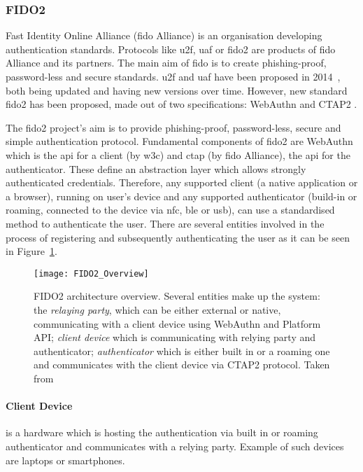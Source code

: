 \subsubsection{FIDO2}

Fast Identity Online Alliance (\acrshort{fido} Alliance) is an organisation developing authentication standards. Protocols like \acrfull{u2f}, \acrfull{uaf} or \acrshort{fido}2 are products of \acrshort{fido} Alliance and its partners.
The main aim of \acrshort{fido} is to create phishing-proof, password-less and secure standards. \acrshort{u2f} and \acrshort{uaf} have been proposed in 2014~\cite{Lindemann2014FIDOV1.0, Srinivas2014UniversalU2F}, both being updated and having new versions over time. However, new standard  \acrshort{fido}2 has been proposed, made out of two specifications: WebAuthn \cite{Balfanz2019Web1} and CTAP2 \cite{Brand2019ClientCTAP}.

The \acrshort{fido}2 project’s aim is to provide phishing-proof, password-less, secure and simple authentication protocol. Fundamental components of \acrshort{fido}2 are WebAuthn which is the \acrshort{api} for a client (by \acrshort{w3c}) and \acrshort{ctap} (by \acrshort{fido} Alliance), the \acrshort{api} for the authenticator. These define an abstraction layer which allows strongly authenticated credentials. Therefore, any supported client (a native application or a browser), running on user’s device and any supported authenticator (build-in or roaming, connected to the device via \acrshort{nfc}, \acrshort{ble} or \acrshort{usb}), can use a standardised method to authenticate the user. There are several entities involved in the process of registering and subsequently authenticating the user as it can be seen in Figure~\ref{fig:fido2_overview}.

\begin{figure}[ht]
    \centering
    \texttt{[image: FIDO2\_Overview]}
    \caption{FIDO2 architecture overview. Several entities make up the system: the \textit{relaying party}, which can be either external or native, communicating with a client device using WebAuthn and Platform API; \textit{client device} which is communicating with relying party and authenticator; \textit{authenticator} which is either built in or a roaming one and communicates with the client device via CTAP2 protocol. Taken from~\cite{Dingle2018All288910}}
    \label{fig:fido2_overview}
\end{figure}

\paragraph{Client Device} 
is a hardware which is hosting the authentication via built in or roaming authenticator and communicates with a relying party. Example of such devices are laptops or smartphones. 

